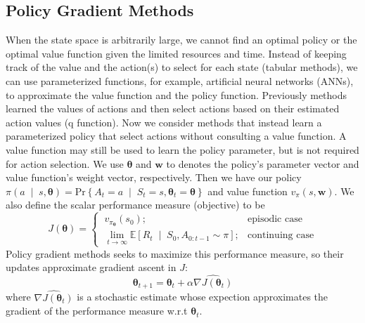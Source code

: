 \documentclass[balance,upint,subscriptcorrection,varvw,mathalfa=cal=boondoxo,pdf-a,colorlinks,nofoot]{asmeconf}
\begin{document}
\subsection{Policy Gradient Methods}
\noindent When the state space is arbitrarily large, we cannot find an optimal 
policy or the optimal value function given the limited resources and time. 
Instead of keeping track of the value and the action(s) to select for each 
state (tabular methods), we can use parameterized functions, for example, 
artificial neural networks (ANNs), to approximate the value function and the 
policy function.
\vspace{3mm}\newline Previously methods learned the values of actions and then
select actions based on their estimated action values (q function). Now we
consider methods that instead learn a parameterized policy that select actions
without consulting a value function. A value function may still be used to
learn the policy parameter, but is not required for action selection.
\vspace{3mm}\newline We use \(\bm{\theta}\) and \(\bm{w}\) to denotes the
policy's parameter vector and value function's weight vector, respectively.
Then we have our policy \(\pi\left(a\;\middle|\;s, \bm{\theta}\right)
=\text{Pr}\left\{A_t=a\;\middle|\;S_t=s, \bm{\theta}_t=\bm{\theta}\right\}\) and
value function \(v_\pi(s, \bm{w})\). We also define the scalar performance
measure (objective) to be
\[J(\bm{\theta})=\begin{cases}
    \ v_{\pi_{\bm{\theta}}}(s_0); &\text{episodic case}\\
    \ \lim_{t \to \infty} \mathbb{E}
    \left[R_t\;\middle|\;S_0,A_{0:t-1}\sim\pi\right];
                                  & \text{continuing case}
\end{cases}\]
Policy gradient methods seeks to maximize this performance measure, so their
updates approximate gradient ascent in \(J\):
\[\bm{\theta}_{t+1}=\bm{\theta}_t+\alpha\widehat{\nabla J(\bm{\theta}_t)}\]
where \(\widehat{\nabla J(\bm{\theta}_t)}\) is a stochastic estimate whose
expection approximates the gradient of the performance measure w.r.t
\(\bm{\theta}_t\).
\end{document}
